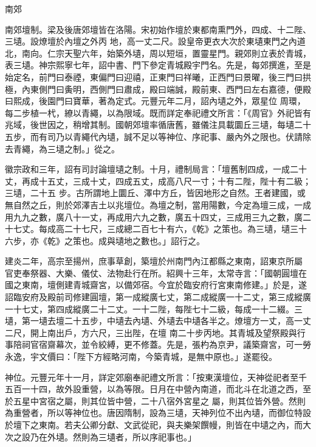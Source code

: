 
\begin{pinyinscope}

 南郊



 南郊壇制。梁及後唐郊壇皆在洛陽。宋初始作壇於東都南熏門外，四成、十二陛、三壝。設燎壇於內壇之外丙
 地，高一丈二尺。設皇帝更衣大次於東壝東門之內道北，南向。仁宗天聖六年，始築外壝，周以短垣，置靈星門。親郊則立表於青城，表三壝。神宗熙寧七年，詔中書、門下參定青城殿宇門名。先是，每郊撰進，至是始定名，前門曰泰禋，東偏門曰迎禧，正東門曰祥曦，正西門曰景曜，後三門曰拱極，內東側門曰夤明，西側門曰肅成，殿曰端誠，殿前東、西門曰左右嘉德，便殿曰熙成，後園門曰寶華，著為定式。元豐元年二月，詔內壝之外，眾星位
 周環，每二步植一杙，繚以青繩，以為限域。既而詳定奉祀禮文所言：「《周官》外祀皆有兆域，後世因之，稍增其制。國朝郊壇率循唐舊，雖儀注具載圜丘三壝，每壝二十五步，而有司乃以青繩代內壝，誠不足以等神位、序祀事、嚴內外之限也。伏請除去青繩，為三壝之制。」從之。



 徽宗政和三年，詔有司討論壇壝之制。十月，禮制局言：「壇舊制四成，一成二十丈，再成十五丈，三成十丈，四成五丈，成高八尺一寸；十有二陛，陛十有二級；三壝，二十五
 步。古所謂地上圜丘、澤中方丘，皆因地形之自然。王者建國，或無自然之丘，則於郊澤吉土以兆壇位。為壇之制，當用陽數，今定為壇三成，一成用九九之數，廣八十一丈，再成用六九之數，廣五十四丈，三成用三九之數，廣二十七丈。每成高二十七尺，三成總二百七十有六，《乾》之策也。為三壝，壝三十六步，亦《乾》之策也。成與壝地之數也。」詔行之。



 建炎二年，高宗至揚州，庶事草創，築壇於州南門內江都縣之東南，詔東京所屬
 官吏奉祭器、大樂、儀仗、法物赴行在所。紹興十三年，太常寺言：「國朝圓壇在國之東南，壇側建青城齋宮，以備郊宿。今宜於臨安府行宮東南修建。」於是，遂詔臨安府及殿前司修建圓壇，第一成縱廣七丈，第二成縱廣一十二丈，第三成縱廣一十七丈，第四成縱廣二十二丈。一十二陛，每陛七十二級，每成一十二綴。三壝，第一壝去壇二十五步，中壝去內壝、外壝去中壝各半之。燎壇方一丈，高一丈二尺，開上南出戶，方六尺，三出陛，在壇
 南二十步丙地。其青城及望祭殿與行事陪祠官宿齋幕次，並令絞縛，更不修蓋。先是，張杓為京尹，議築齋宮，可一勞永逸，宇文價曰：「陛下方經略河南，今築青城，是無中原也。」遂罷役。



 神位。元豐元年十一月，詳定郊廟奉祀禮文所言：「按東漢壇位，天神從祀者至千五百一十四，故外設重營，以為等限。日月在中營內南道，而北斗在北道之西，至於五星中宮宿之屬，則其位皆中營，二十八宿外宮星之
 屬，則其位皆外營。然則為重營者，所以等神位也。唐因隋制，設為三壝，天神列位不出內壝，而御位特設於壇下之東南。若夫公卿分獻、文武從祀，與夫樂架饌幔，則皆在中壝之內，而大次之設乃在外壝。然則為三壝者，所以序祀事也。」




\end{pinyinscope}
